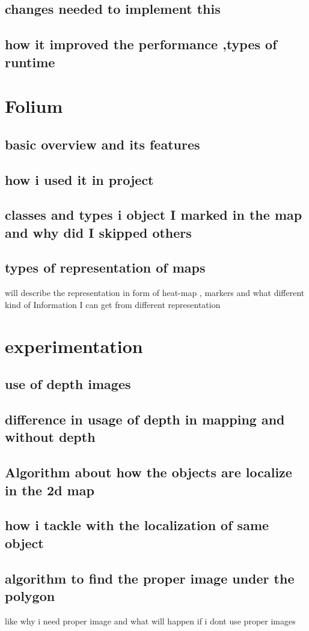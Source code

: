 \subsection{changes needed to implement this }

\subsection{how it improved the performance ,types of runtime}




\section{Folium}

\subsection{basic overview and its features}

\subsection{how i used it in project }

\subsection{classes and types i object I marked in the map and why did I skipped others}

\subsection{types of representation of maps }

will describe the representation in form of heat-map , markers and what different kind of Information I can get from different representation




\section{experimentation}

\subsection{use of depth images }

\subsection{difference in usage of depth in mapping and without depth}

\subsection{Algorithm about how the objects are localize in the 2d map}

\subsection{how i tackle with the localization of same object }

\subsection{algorithm to find the proper image under the polygon}
like why i need proper image and what will happen if i dont use proper images 

